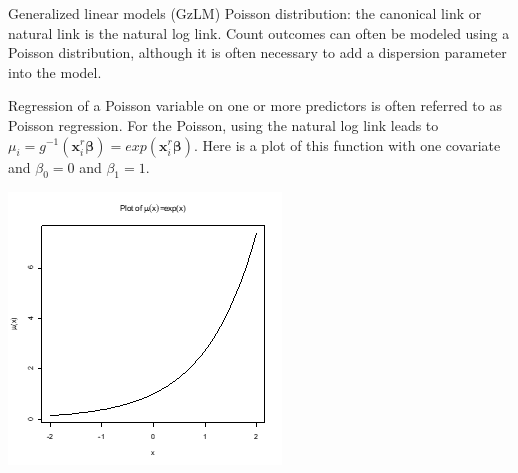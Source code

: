 \documentclass[
  9pt,
  ignorenonframetext,
]{beamer}
\begin{document}
\begin{frame}{Generalized linear models (GzLM)}
\protect\hypertarget{generalized-linear-models-gzlm}{}
Poisson distribution: the canonical link or natural link is the natural
log link. Count outcomes can often be modeled using a Poisson
distribution, although it is often necessary to add a dispersion
parameter into the model.

Regression of a Poisson variable on one or more predictors is often
referred to as Poisson regression. For the Poisson, using the natural
log link leads to
\(\mu_i=g^{-1} (\pmb x_i^r \pmb \beta)=exp(\pmb x_i^r \pmb \beta)\).
Here is a plot of this function with one covariate and \(\beta_0=0\) and
\(\beta_1=1\).

\begin{center}\includegraphics[width=0.5\linewidth]{figs_L14/f1} \end{center}
\end{frame}
\end{document}
